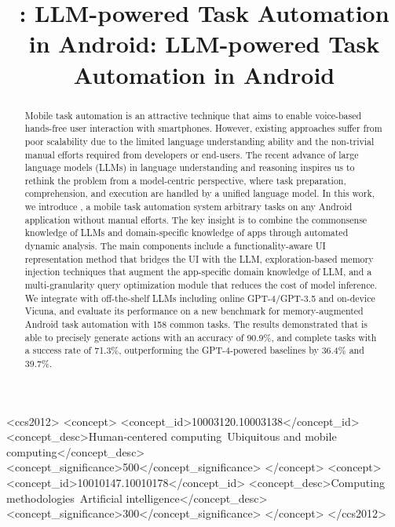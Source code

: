 \title{\name: LLM-powered Task Automation in Android}



\title{\name: LLM-powered Task Automation in Android}

\begin{abstract}
Mobile task automation is an attractive technique that aims to enable voice-based hands-free user interaction with smartphones.
However, existing approaches suffer from poor scalability due to the limited language understanding ability and the non-trivial manual efforts required from developers or end-users.
The recent advance of large language models (LLMs) in language understanding and reasoning inspires us to rethink the problem from a model-centric perspective, where task preparation, comprehension, and execution are handled by a unified language model. 
In this work, we introduce \name, a mobile task automation system  arbitrary tasks on any Android application without manual efforts. 
The key insight is to combine the commonsense knowledge of LLMs and domain-specific knowledge of apps through automated dynamic analysis.
The main components include a functionality-aware UI representation method that bridges the UI with the LLM, exploration-based memory injection techniques that augment the app-specific domain knowledge of LLM, and a multi-granularity query optimization module that reduces the cost of model inference. 
We integrate \name with off-the-shelf LLMs including online GPT-4/GPT-3.5 and on-device Vicuna, and evaluate its performance on a new benchmark for memory-augmented Android task automation with 158 common tasks. The results demonstrated that \name is able to precisely generate actions with an accuracy of 90.9\%, and complete tasks with a success rate of 71.3\%, outperforming the GPT-4-powered baselines by 36.4\% and 39.7\%. %
\end{abstract}

\begin{CCSXML}
<ccs2012>
   <concept>
       <concept_id>10003120.10003138</concept_id>
       <concept_desc>Human-centered computing~Ubiquitous and mobile computing</concept_desc>
       <concept_significance>500</concept_significance>
       </concept>
   <concept>
       <concept_id>10010147.10010178</concept_id>
       <concept_desc>Computing methodologies~Artificial intelligence</concept_desc>
       <concept_significance>300</concept_significance>
       </concept>
 </ccs2012>
\end{CCSXML}

